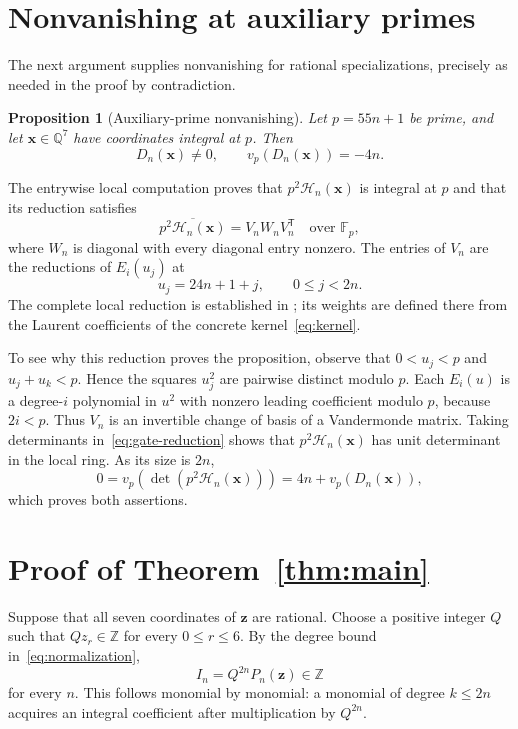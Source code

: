 \documentclass[11pt]{article}
\newtheorem{proposition}[theorem]{Proposition}
\newcommand{\Q}{\mathbb Q}
\newcommand{\Z}{\mathbb Z}
\newcommand{\F}{\mathbb F}
\newcommand{\code}[1]{\texttt{\small\detokenize{#1}}}
\begin{document}
\section{Nonvanishing at auxiliary primes}\label{sec:gate}
The next argument supplies nonvanishing for rational specializations,
precisely as needed in the proof by contradiction.
\begin{proposition}[Auxiliary-prime nonvanishing]\label{prop:gate}
Let $p=55n+1$ be prime, and let $\mathbf x\in\Q^7$ have coordinates
integral at $p$. Then
\[
D_n(\mathbf x)\ne0,\qquad v_p(D_n(\mathbf x))=-4n.
\]
\end{proposition}
The entrywise local computation proves that $p^2\mathcal H_n(\mathbf x)$
is integral at $p$ and that its reduction satisfies
\begin{equation}\label{eq:gate-reduction}
\overline{p^2\mathcal H_n(\mathbf x)}=V_nW_nV_n^{\mathsf T}
\quad\text{over }\F_p,
\end{equation}
where $W_n$ is diagonal with every diagonal entry nonzero. The entries of
$V_n$ are the reductions of $E_i(u_j)$ at
\[
u_j=24n+1+j,\qquad 0\leq j<2n.
\]
The complete local reduction is established in
\code{H158GateAssembly.lean}; its weights are defined there from the
Laurent coefficients of the concrete kernel~\eqref{eq:kernel}.

To see why this reduction proves the proposition, observe that
$0<u_j<p$ and $u_j+u_k<p$. Hence the squares $u_j^2$ are pairwise distinct
modulo $p$. Each $E_i(u)$ is a degree-$i$ polynomial in $u^2$ with nonzero
leading coefficient modulo $p$, because $2i<p$. Thus $V_n$ is an
invertible change of basis of a Vandermonde matrix. Taking determinants
in~\eqref{eq:gate-reduction} shows that $p^2\mathcal H_n(\mathbf x)$
has unit determinant in the local ring. As its size is $2n$,
\[
0=v_p\!\left(\det(p^2\mathcal H_n(\mathbf x))\right)
 =4n+v_p(D_n(\mathbf x)),
\]
which proves both assertions.

\section{Proof of Theorem~\ref{thm:main}}
Suppose that all seven coordinates of $\mathbf z$ are rational. Choose a
positive integer $Q$ such that $Qz_r\in\Z$ for every $0\leq r\leq6$.
By the degree bound in~\eqref{eq:normalization},
\begin{equation}\label{eq:integer}
I_n=Q^{2n}P_n(\mathbf z)\in\Z
\end{equation}
for every $n$. This follows monomial by monomial: a monomial of degree
$k\leq2n$ acquires an integral coefficient after multiplication by
$Q^{2n}$.
\end{document}
